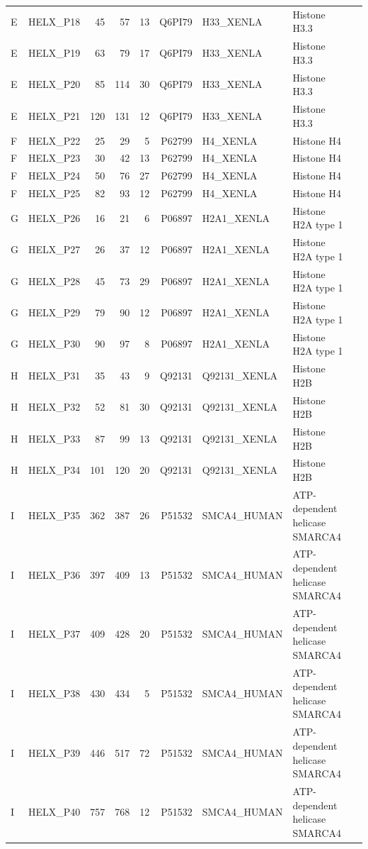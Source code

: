 \begin{longtable}{@{}llrrrrllp{5.2cm}@{}}
  E & HELX_P18 & 45 & 57 & 13 & Q6PI79 & H33_XENLA & Histone H3.3 \\
  E & HELX_P19 & 63 & 79 & 17 & Q6PI79 & H33_XENLA & Histone H3.3 \\
  E & HELX_P20 & 85 & 114 & 30 & Q6PI79 & H33_XENLA & Histone H3.3 \\
  E & HELX_P21 & 120 & 131 & 12 & Q6PI79 & H33_XENLA & Histone H3.3 \\
  F & HELX_P22 & 25 & 29 & 5 & P62799 & H4_XENLA & Histone H4 \\
  F & HELX_P23 & 30 & 42 & 13 & P62799 & H4_XENLA & Histone H4 \\
  F & HELX_P24 & 50 & 76 & 27 & P62799 & H4_XENLA & Histone H4 \\
  F & HELX_P25 & 82 & 93 & 12 & P62799 & H4_XENLA & Histone H4 \\
  G & HELX_P26 & 16 & 21 & 6 & P06897 & H2A1_XENLA & Histone H2A type 1 \\
  G & HELX_P27 & 26 & 37 & 12 & P06897 & H2A1_XENLA & Histone H2A type 1 \\
  G & HELX_P28 & 45 & 73 & 29 & P06897 & H2A1_XENLA & Histone H2A type 1 \\
  G & HELX_P29 & 79 & 90 & 12 & P06897 & H2A1_XENLA & Histone H2A type 1 \\
  G & HELX_P30 & 90 & 97 & 8 & P06897 & H2A1_XENLA & Histone H2A type 1 \\
  H & HELX_P31 & 35 & 43 & 9 & Q92131 & Q92131_XENLA & Histone H2B \\
  H & HELX_P32 & 52 & 81 & 30 & Q92131 & Q92131_XENLA & Histone H2B \\
  H & HELX_P33 & 87 & 99 & 13 & Q92131 & Q92131_XENLA & Histone H2B \\
  H & HELX_P34 & 101 & 120 & 20 & Q92131 & Q92131_XENLA & Histone H2B \\
  I & HELX_P35 & 362 & 387 & 26 & P51532 & SMCA4_HUMAN & ATP-dependent helicase SMARCA4 \\
  I & HELX_P36 & 397 & 409 & 13 & P51532 & SMCA4_HUMAN & ATP-dependent helicase SMARCA4 \\
  I & HELX_P37 & 409 & 428 & 20 & P51532 & SMCA4_HUMAN & ATP-dependent helicase SMARCA4 \\
  I & HELX_P38 & 430 & 434 & 5 & P51532 & SMCA4_HUMAN & ATP-dependent helicase SMARCA4 \\
  I & HELX_P39 & 446 & 517 & 72 & P51532 & SMCA4_HUMAN & ATP-dependent helicase SMARCA4 \\
  I & HELX_P40 & 757 & 768 & 12 & P51532 & SMCA4_HUMAN & ATP-dependent helicase SMARCA4 \\

\end{longtable}

